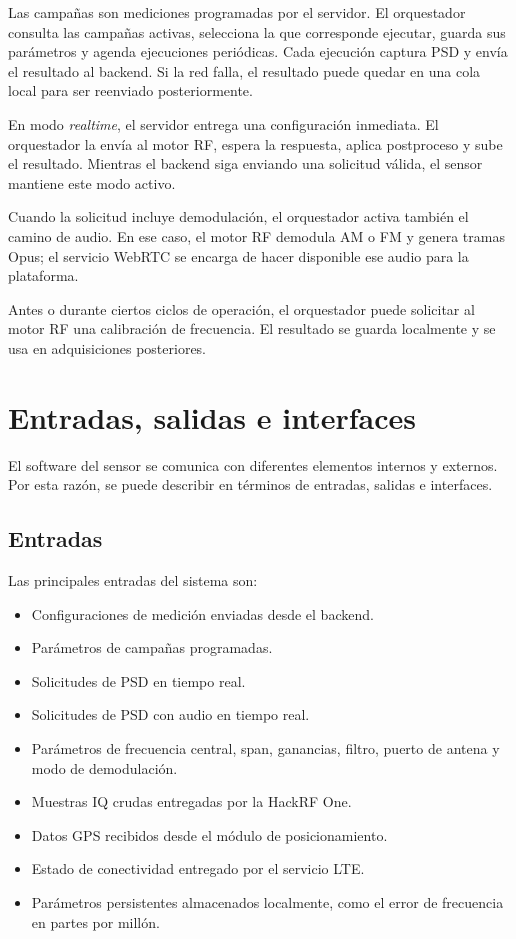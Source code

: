 Las campañas son mediciones programadas por el servidor. El orquestador consulta
las campañas activas, selecciona la que corresponde ejecutar, guarda sus parámetros
y agenda ejecuciones periódicas. Cada ejecución captura PSD y envía el resultado
al backend. Si la red falla, el resultado puede quedar en una cola local para ser
reenviado posteriormente.

En modo \textit{realtime}, el servidor entrega una configuración inmediata. El
orquestador la envía al motor RF, espera la respuesta, aplica postproceso y sube
el resultado. Mientras el backend siga enviando una solicitud válida, el sensor
mantiene este modo activo.

Cuando la solicitud incluye demodulación, el orquestador activa también el camino
de audio. En ese caso, el motor RF demodula AM o FM y genera tramas Opus; el
servicio WebRTC se encarga de hacer disponible ese audio para la plataforma.

Antes o durante ciertos ciclos de operación, el orquestador puede solicitar al
motor RF una calibración de frecuencia. El resultado se guarda localmente y se usa
en adquisiciones posteriores.


\section{Entradas, salidas e interfaces}

El software del sensor se comunica con diferentes elementos internos y externos.
Por esta razón, se puede describir en términos de entradas, salidas e interfaces.

\subsection{Entradas}

Las principales entradas del sistema son:

\begin{itemize}
  \item Configuraciones de medición enviadas desde el backend.
  \item Parámetros de campañas programadas.
  \item Solicitudes de PSD en tiempo real.
  \item Solicitudes de PSD con audio en tiempo real.
  \item Parámetros de frecuencia central, span, ganancias, filtro, puerto de
  antena y modo de demodulación.
  \item Muestras IQ crudas entregadas por la HackRF One.
  \item Datos GPS recibidos desde el módulo de posicionamiento.
  \item Estado de conectividad entregado por el servicio LTE.
  \item Parámetros persistentes almacenados localmente, como el error de
  frecuencia en partes por millón.
\end{itemize}

